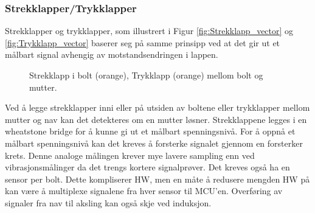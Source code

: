\subsubsection{Strekklapper/Trykklapper}

Strekklapper og trykklapper, som illustrert i Figur \ref{fig:Strekklapp_vector} og \ref{fig:Trykklapp_vector} baserer seg på samme prinsipp ved at det gir ut et målbart signal avhengig av
motstandsendringen i lappen. 
\begin{figure}[H] \centering
{}
\hfill
{}
\caption{\protect{\ref{fig:Strekklapp_vector}} Strekklapp i bolt (orange), \protect{\ref{fig:Trykklapp_vector}} Trykklapp (orange) mellom bolt og mutter.}
\end{figure}
Ved å legge strekklapper inni eller på utsiden av boltene eller
trykklapper mellom mutter og nav kan det detekteres om en mutter løsner. Strekklappene
legges i en wheatstone bridge \cite{wheatstone} for å kunne gi ut et målbart
spenningsnivå. For å oppnå et målbart spenningsnivå kan det kreves å
forsterke signalet gjennom en forsterker krets. Denne analoge målingen krever mye lavere sampling enn ved
vibrasjonsmålinger da det trengs kortere signalprøver.
Det kreves også ha en sensor per bolt. Dette kompliserer HW, men en måte å redusere
mengden HW på kan være å multiplexe signalene fra hver sensor til MCU'en. 
Overføring av signaler fra nav til aksling kan også skje ved induksjon. 

